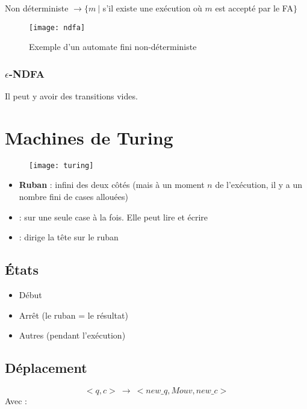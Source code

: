 Non déterministe $\rightarrow \{m\ |$ s'il existe une exécution où $m$ est accepté par le FA$\}$

\begin{figure}[H]
    \centering
    \texttt{[image: ndfa]}
    \caption{Exemple d'un automate fini non-déterministe}
\end{figure}

\subsubsection{$\epsilon$-NDFA}

Il peut y avoir des transitions vides.

\newpage
\section{Machines de Turing}

\begin{figure}[H]
    \centering
    \texttt{[image: turing]}
\end{figure}

\begin{itemize}
\item \textbf{Ruban} : infini des deux côtés (mais à un moment $n$ de l'exécution, il y a un nombre fini de cases allouées)
\item {} : sur une seule case à la fois. Elle peut lire et écrire
\item {} : dirige la tête sur le ruban
\end{itemize}

\subsection{États}

\begin{itemize}
\item Début
\item Arrêt (le ruban = le résultat)
\item Autres (pendant l'exécution)
\end{itemize}

\subsection{Déplacement}

\begin{equation*}
<q, c>\ \rightarrow\ <new\_q, Mouv, new\_c>
\end{equation*}
Avec :

